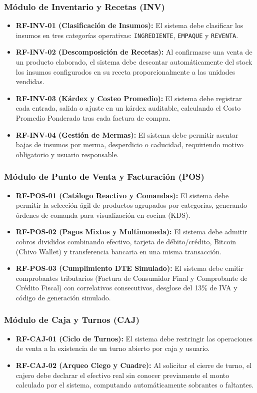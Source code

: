 \subsubsection{Módulo de Inventario y Recetas (INV)}
\begin{itemize}
    \item \textbf{RF-INV-01 (Clasificación de Insumos):} El sistema debe clasificar los insumos en tres categorías operativas: \texttt{INGREDIENTE}, \texttt{EMPAQUE} y \texttt{REVENTA}.
    \item \textbf{RF-INV-02 (Descomposición de Recetas):} Al confirmarse una venta de un producto elaborado, el sistema debe descontar automáticamente del stock los insumos configurados en su receta proporcionalmente a las unidades vendidas.
    \item \textbf{RF-INV-03 (Kárdex y Costeo Promedio):} El sistema debe registrar cada entrada, salida o ajuste en un kárdex auditable, calculando el Costo Promedio Ponderado tras cada factura de compra.
    \item \textbf{RF-INV-04 (Gestión de Mermas):} El sistema debe permitir asentar bajas de insumos por merma, desperdicio o caducidad, requiriendo motivo obligatorio y usuario responsable.
\end{itemize}

\subsubsection{Módulo de Punto de Venta y Facturación (POS)}
\begin{itemize}
    \item \textbf{RF-POS-01 (Catálogo Reactivo y Comandas):} El sistema debe permitir la selección ágil de productos agrupados por categorías, generando órdenes de comanda para visualización en cocina (KDS).
    \item \textbf{RF-POS-02 (Pagos Mixtos y Multimoneda):} El sistema debe admitir cobros divididos combinando efectivo, tarjeta de débito/crédito, Bitcoin (Chivo Wallet) y transferencia bancaria en una misma transacción.
    \item \textbf{RF-POS-03 (Cumplimiento DTE Simulado):} El sistema debe emitir comprobantes tributarios (Factura de Consumidor Final y Comprobante de Crédito Fiscal) con correlativos consecutivos, desglose del 13\% de IVA y código de generación simulado.
\end{itemize}

\subsubsection{Módulo de Caja y Turnos (CAJ)}
\begin{itemize}
    \item \textbf{RF-CAJ-01 (Ciclo de Turnos):} El sistema debe restringir las operaciones de venta a la existencia de un turno abierto por caja y usuario.
    \item \textbf{RF-CAJ-02 (Arqueo Ciego y Cuadre):} Al solicitar el cierre de turno, el cajero debe declarar el efectivo real sin conocer previamente el monto calculado por el sistema, computando automáticamente sobrantes o faltantes.
\end{itemize}

